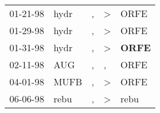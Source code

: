 \begin{supertabular}{p{0.07\textwidth}p{0.06\textwidth}p{0.02\textwidth}p{0.02\textwidth}p{0.06\textwidth}}
 01-21-98\textsuperscript{} &  hydr\textsuperscript{} &  , &  \textgreater &           ORFE\textsuperscript{} \\
 01-29-98\textsuperscript{} &  hydr\textsuperscript{} &  , &  \textgreater &           ORFE\textsuperscript{} \\
 01-31-98\textsuperscript{} &  hydr\textsuperscript{} &  , &  \textgreater &  \textbf{ORFE\textsuperscript{}} \\
 02-11-98\textsuperscript{} &   AUG\textsuperscript{} &  , &             , &           ORFE\textsuperscript{} \\
 04-01-98\textsuperscript{} &  MUFB\textsuperscript{} &  , &  \textgreater &           ORFE\textsuperscript{} \\
 06-06-98\textsuperscript{} &  rebu\textsuperscript{} &  , &  \textgreater &           rebu\textsuperscript{} \\
\end{supertabular}
